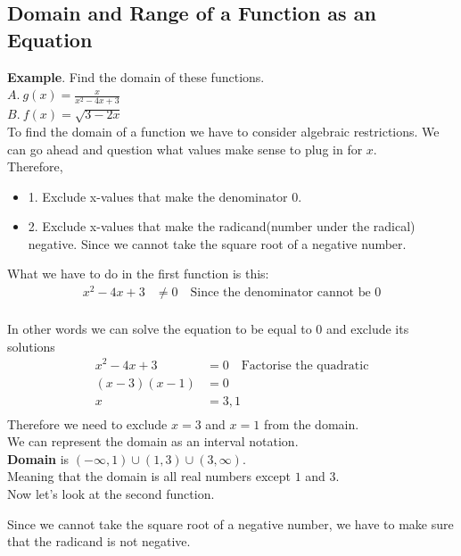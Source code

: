 \subsection{Domain and Range of a Function as an Equation}
\textbf{Example}. Find the domain of these functions. \\
$\displaystyle A. \ g(x) = \frac{x}{x^2 - 4x + 3}$ \\
$\displaystyle B. \ f(x) = \sqrt{3-2x}$ \\
To find the domain of a function we have to consider algebraic restrictions. We can go ahead and question what values make sense to plug in for $x$. \\
Therefore,
\begin{itemize}
	\item 1. Exclude x-values that make the denominator 0.
	\item 2. Exclude x-values that make the radicand(number under the radical) negative. Since we cannot take the square root of a negative number.
\end{itemize}

What we have to do in the first function is this:
\begin{align*}
	x^2-4x+3 & \neq 0 \quad \text{Since the denominator cannot be 0} \\
\end{align*}

In other words we can solve the equation to be equal to 0 and exclude its solutions
\begin{align*}
	x^2-4x+3   & = 0 \quad \text{Factorise the quadratic} \\
	(x-3)(x-1) & = 0                                      \\
	x          & = 3, 1                                   \\
\end{align*}
Therefore we need to exclude $x=3$ and $x=1$ from the domain. \\

We can represent the domain as an interval notation. \\
\textbf{Domain} is $(-\infty, 1) \cup (1, 3) \cup (3, \infty)$. \\
Meaning that the domain is all real numbers except $1$ and $3$. \\

Now let's look at the second function.

Since we cannot take the square root of a negative number, we have to make sure that the radicand is not negative. \\


